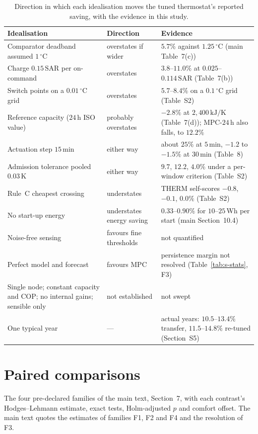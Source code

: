 \documentclass[11pt]{article}
\newcommand{\SAR}{\text{SAR}}
\begin{document}
\begin{table}[!ht]
\centering
\caption{Direction in which each idealisation moves the tuned thermostat's
reported saving, with the evidence in this study.}
\label{tab:s-bias}
\small
\begin{tabularx}{\textwidth}{@{}>{\raggedright\arraybackslash}p{}>{\raggedright\arraybackslash}p{}X@{}}
\toprule
Idealisation & Direction & Evidence \\
\midrule
Comparator deadband assumed $1\,^\circ$C & overstates if wider & $5.7\%$ against $1.25\,^\circ$C (main Table~7(c)) \\
Charge $0.15\,\SAR$ per on-command & overstates & $3.8$--$11.0\%$ at $0.025$--$0.114\,\SAR$ (Table~7(b)) \\
Switch points on a $0.01\,^\circ$C grid & overstates & $5.7$--$8.4\%$ on a $0.1\,^\circ$C grid (Table~S2) \\
Reference capacity ($24\,$h ISO value) & probably overstates & $-2.8\%$ at $2{,}400\,\text{kJ/K}$ (Table~7(d)); MPC-$24\,$h also falls, to $12.2\%$ \\
Actuation step $15\,$min & either way & about $25\%$ at $5\,$min, $-1.2$ to $-1.5\%$ at $30\,$min (Table~8) \\
Admission tolerance pooled $0.03\,$K & either way & $9.7$, $12.2$, $4.0\%$ under a per-window criterion (Table~S2) \\
Rule~C cheapest crossing & understates & THERM self-scores $-0.8$, $-0.1$, $0.0\%$ (Table~S2) \\
No start-up energy & understates energy saving & $0.33$--$0.90\%$ for $10$--$25\,$Wh per start (main Section~10.4) \\
Noise-free sensing & favours fine thresholds & not quantified \\
Perfect model and forecast & favours MPC & persistence margin not resolved (Table~\ref{tab:s-stats}, F3) \\
Single node; constant capacity and COP; no internal gains; sensible only & not established & not swept \\
One typical year & --- & actual years: $10.5$--$13.4\%$ transfer, $11.5$--$14.8\%$ re-tuned (Section~S5) \\
\bottomrule
\end{tabularx}
\end{table}

\section{Paired comparisons}
The four pre-declared families of the main text, Section~7, with each contrast's Hodges--Lehmann estimate, exact tests, Holm-adjusted $p$ and comfort offset. The main text quotes the estimates of families F1, F2 and F4 and the resolution of F3.
\end{document}
